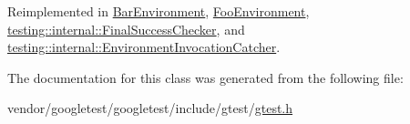 Reimplemented in \hyperlink{class_bar_environment_a384f951da72a2a18bb0c2b3506376b09}{Bar\+Environment}, \hyperlink{class_foo_environment_a99a2c9df52106cce9e7a4bdda53df802}{Foo\+Environment}, \hyperlink{classtesting_1_1internal_1_1_final_success_checker_a8f39d12a1f2bfe8c6c04b5c6749382c9}{testing\+::internal\+::\+Final\+Success\+Checker}, and \hyperlink{classtesting_1_1internal_1_1_environment_invocation_catcher_afc89ee0a8e32e6746a89fcc1682f62e9}{testing\+::internal\+::\+Environment\+Invocation\+Catcher}.



The documentation for this class was generated from the following file\+:\begin{DoxyCompactItemize}
\item 
vendor/googletest/googletest/include/gtest/\hyperlink{gtest_8h}{gtest.\+h}\end{DoxyCompactItemize}
